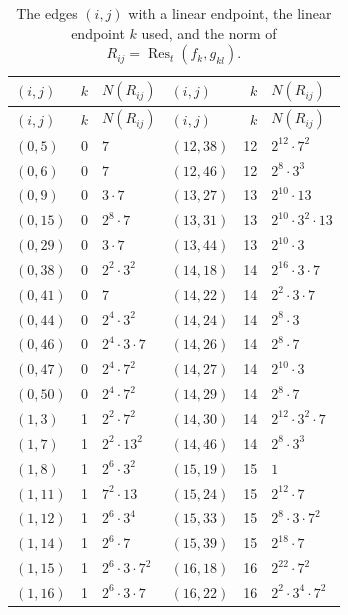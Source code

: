 \documentclass[11pt]{article}
\begin{document}
\begingroup\small
\setlength{\LTcapwidth}{\textwidth}
\begin{longtable}{@{}lrl@{\qquad}lrl@{}}
\caption{The edges $(i,j)$ with a linear endpoint, the linear endpoint $k$ used, and the norm of $R_{ij}=\operatorname{Res}_t(f_k,g_{kl})$.}\label{tab:sep}\\
\hline $(i,j)$ & $k$ & $N(R_{ij})$ & $(i,j)$ & $k$ & $N(R_{ij})$\\\hline\endfirsthead\hline $(i,j)$ & $k$ & $N(R_{ij})$ & $(i,j)$ & $k$ & $N(R_{ij})$\\\hline\endhead\hline\endfoot
$(0,5)$ & 0 & $7$ & $(12,38)$ & 12 & $2^{12}\cdot 7^{2}$\\
$(0,6)$ & 0 & $7$ & $(12,46)$ & 12 & $2^{8}\cdot 3^{3}$\\
$(0,9)$ & 0 & $3\cdot 7$ & $(13,27)$ & 13 & $2^{10}\cdot 13$\\
$(0,15)$ & 0 & $2^{8}\cdot 7$ & $(13,31)$ & 13 & $2^{10}\cdot 3^{2}\cdot 13$\\
$(0,29)$ & 0 & $3\cdot 7$ & $(13,44)$ & 13 & $2^{10}\cdot 3$\\
$(0,38)$ & 0 & $2^{2}\cdot 3^{2}$ & $(14,18)$ & 14 & $2^{16}\cdot 3\cdot 7$\\
$(0,41)$ & 0 & $7$ & $(14,22)$ & 14 & $2^{2}\cdot 3\cdot 7$\\
$(0,44)$ & 0 & $2^{4}\cdot 3^{2}$ & $(14,24)$ & 14 & $2^{8}\cdot 3$\\
$(0,46)$ & 0 & $2^{4}\cdot 3\cdot 7$ & $(14,26)$ & 14 & $2^{8}\cdot 7$\\
$(0,47)$ & 0 & $2^{4}\cdot 7^{2}$ & $(14,27)$ & 14 & $2^{10}\cdot 3$\\
$(0,50)$ & 0 & $2^{4}\cdot 7^{2}$ & $(14,29)$ & 14 & $2^{8}\cdot 7$\\
$(1,3)$ & 1 & $2^{2}\cdot 7^{2}$ & $(14,30)$ & 14 & $2^{12}\cdot 3^{2}\cdot 7$\\
$(1,7)$ & 1 & $2^{2}\cdot 13^{2}$ & $(14,46)$ & 14 & $2^{8}\cdot 3^{3}$\\
$(1,8)$ & 1 & $2^{6}\cdot 3^{2}$ & $(15,19)$ & 15 & $1$\\
$(1,11)$ & 1 & $7^{2}\cdot 13$ & $(15,24)$ & 15 & $2^{12}\cdot 7$\\
$(1,12)$ & 1 & $2^{6}\cdot 3^{4}$ & $(15,33)$ & 15 & $2^{8}\cdot 3\cdot 7^{2}$\\
$(1,14)$ & 1 & $2^{6}\cdot 7$ & $(15,39)$ & 15 & $2^{18}\cdot 7$\\
$(1,15)$ & 1 & $2^{6}\cdot 3\cdot 7^{2}$ & $(16,18)$ & 16 & $2^{22}\cdot 7^{2}$\\
$(1,16)$ & 1 & $2^{6}\cdot 3\cdot 7$ & $(16,22)$ & 16 & $2^{2}\cdot 3^{4}\cdot 7^{2}$\\

\end{longtable}
\end{document}
